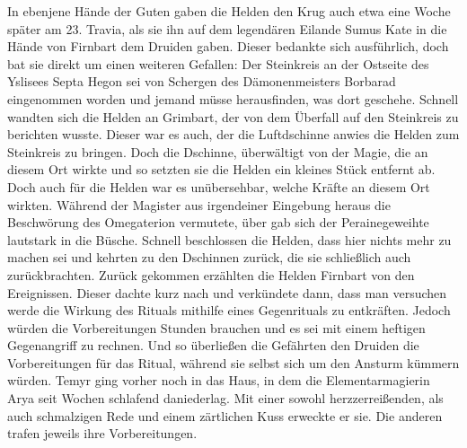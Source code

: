 In ebenjene Hände der Guten gaben die Helden den Krug auch etwa eine Woche später am 23. Travia, als sie ihn auf dem legendären Eilande Sumus Kate in die Hände von Firnbart dem Druiden gaben. Dieser bedankte sich ausführlich, doch bat sie direkt um einen weiteren Gefallen: Der Steinkreis an der Ostseite des Yslisees Septa Hegon sei von Schergen des Dämonenmeisters Borbarad eingenommen worden und jemand müsse herausfinden, was dort geschehe. Schnell wandten sich die Helden an Grimbart, der von dem Überfall auf den Steinkreis zu berichten wusste. Dieser war es auch, der die Luftdschinne anwies die Helden zum Steinkreis zu bringen. Doch die Dschinne, überwältigt von der Magie, die an diesem Ort wirkte und so setzten sie die Helden ein kleines Stück entfernt ab. Doch auch für die Helden war es unübersehbar, welche Kräfte an diesem Ort wirkten. Während der Magister aus irgendeiner Eingebung heraus die Beschwörung des Omegaterion vermutete, über gab sich der Perainegeweihte lautstark in die Büsche. Schnell beschlossen die Helden, dass hier nichts mehr zu machen sei und kehrten zu den Dschinnen zurück, die sie schließlich auch zurückbrachten. Zurück gekommen erzählten die Helden Firnbart von den Ereignissen. Dieser dachte kurz nach und verkündete dann, dass man versuchen werde die Wirkung des Rituals mithilfe eines Gegenrituals zu entkräften. Jedoch würden die Vorbereitungen Stunden brauchen und es sei mit einem heftigen Gegenangriff zu rechnen. Und so überließen die Gefährten den Druiden die Vorbereitungen für das Ritual, während sie selbst sich um den Ansturm kümmern würden. Temyr ging vorher noch in das Haus, in dem die Elementarmagierin Arya seit Wochen schlafend daniederlag. Mit einer sowohl herzzerreißenden, als auch schmalzigen Rede und einem zärtlichen Kuss erweckte er sie. Die anderen trafen jeweils ihre Vorbereitungen.

